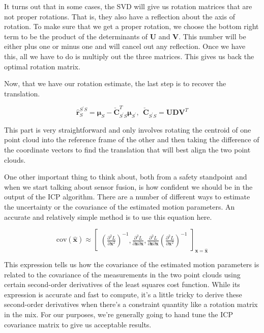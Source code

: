 It turns out that in some cases, the SVD will give us rotation matrices that
are not proper rotations. That is, they also have a reflection about
the axis of rotation. To make sure that we
get a proper rotation, we choose the bottom
right term to be the product of
the determinants of $\mathbf{U}$ and $\mathbf{V}$. This number will be either plus one or minus one and will
cancel out any reflection. Once we have this,
all we have to do is multiply out the three matrices. This gives us back
the optimal rotation matrix. 

Now, that we have our rotation estimate, the last step is to
recover the translation. 

\begin{equation}
\hat{\mathbf{r}}_{S}^{S^{'}S} = \boldsymbol{\mu}_S - \check{\mathbf{C}}_{S^{'}S}^T \boldsymbol{\mu}_{S^{'}}, ~~ \check{\mathbf{C}}_{S^{'}S} = \mathbf{U}\mathbf{D}\mathbf{V}^T
\end{equation}

This part is very straightforward and only involves rotating the centroid of one point cloud into
the reference frame of the other and then
taking the difference of the coordinate vectors to find the translation that will best align the two point clouds. 

One other important thing to think about, both from a safety standpoint
and when we start talking about sensor fusion, is how confident we should be in the output of the ICP algorithm. There are a number
of different ways to estimate the uncertainty or the covariance of
the estimated motion parameters. An accurate and
relatively simple method is to use this equation here. 

\begin{equation}
\text{cov}(\hat{\mathbf{x}}) \approx
\begin{bmatrix}
(\frac{\partial^2 L}{\partial \mathbf{x}^2})^{-1}, \frac{\partial^2 L}{\partial \mathbf{z}\partial\mathbf{x}}, \frac{\partial^2 L}{\partial \mathbf{z}\partial\mathbf{x}}(\frac{\partial^2 L}{\partial \mathbf{x}^2})^{-1} 
\end{bmatrix}_{\mathbf{x} = \hat{\mathbf{x}}}
\end{equation}

This expression tells us
how the covariance of the estimated motion parameters is related to the covariance of the measurements in
the two point clouds using certain second-order
derivatives of the least squares cost function. While its expression is
accurate and fast to compute, it's a little tricky to derive these second-order
derivatives when there's a constraint quantity like
a rotation matrix in the mix. For our purposes, we're
generally going to hand tune the ICP covariance matrix to
give us acceptable results. 

